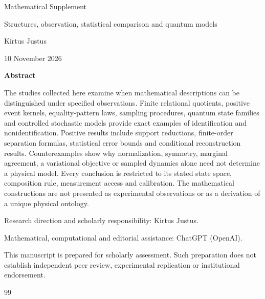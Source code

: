 \documentclass[11pt,a4paper]{article}
\begin{document}
\begin{titlepage}
\vspace*{12mm}
{\huge\bfseries\raggedright{} \ProgramTitle\par}
\vspace{9mm}
{\Large Mathematical Supplement\par}
\vspace{7mm}
{\large Structures, observation, statistical comparison and quantum models\par}
\vspace{14mm}
Kirtus Justus\par
\AuthorLocation\par
10 November 2026\par
\vspace{12mm}
\textbf{Abstract}\par
The studies collected here examine when mathematical descriptions can be
distinguished under specified observations. Finite relational quotients,
positive event kernels, equality-pattern laws, sampling procedures, quantum
state families and controlled stochastic models provide exact examples of
identification and nonidentification. Positive results include support
reductions, finite-order separation formulas, statistical error bounds and
conditional reconstruction results. Counterexamples show why normalization,
symmetry, marginal agreement, a variational objective or sampled dynamics alone
need not determine a physical model. Every conclusion is restricted to its
stated state space, composition rule, measurement access and calibration.
The mathematical constructions are not presented as experimental observations
or as a derivation of a unique physical ontology.\par
\vfill
Research direction and scholarly responsibility: Kirtus Justus.\par
Mathematical, computational and editorial assistance: ChatGPT (OpenAI).\par
This manuscript is prepared for scholarly assessment. Such preparation does
not establish independent peer review, experimental replication or institutional
endorsement.\par
\end{titlepage}
\setcounter{page}{2}

\clearpage

\clearpage

\clearpage

\clearpage

\clearpage

\clearpage
\begin{thebibliography}{99}



\end{thebibliography}
\end{document}
